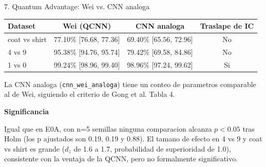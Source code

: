 \documentclass[aspectratio=169]{beamer}
\newcommand{\bmheading}[2]{\textbf{\color{#1}#2}\par\smallskip}
\newcommand{\bandedtable}{\rowcolors{2}{white}{bmRowAlt}}
\begin{document}
\begin{frame}{7. Quantum Advantage: Wei vs. CNN analoga}
  \footnotesize
  \bandedtable
  \begin{tabular}{@{}lccc@{}}
    \toprule
    \textbf{Dataset} & \textbf{Wei (QCNN)} & \textbf{CNN analoga} & \textbf{Traslape de IC} \\
    \midrule
    coat vs shirt & 77.10\% [76.68, 77.36] & 69.40\% [65.56, 72.96] & No \\
    4 vs 9        & 95.38\% [94.76, 95.74] & 79.42\% [69.58, 84.86] & No \\
    1 vs 0        & 99.24\% [98.96, 99.40] & 98.96\% [97.24, 99.62] & Si \\
    \bottomrule
  \end{tabular}

  \vspace{10pt}
  La CNN analoga (\texttt{cnn\_wei\_analoga}) tiene un conteo de parametros
  comparable al de Wei, siguiendo el criterio de Gong et al. Tabla 4.

  \vspace{6pt}
  \begin{amberbox}
    \bmheading{bmAmber}{Significancia}
    Igual que en E0A, con n=5 semillas ninguna comparacion alcanza $p<0.05$
    tras Holm (los p ajustados son 0.19, 0.19 y 0.88). El tamano de efecto en
    4 vs 9 y coat vs shirt es grande ($d_z$ de 1.6 a 1.7, probabilidad de
    superioridad de 1.0), consistente con la ventaja de la QCNN, pero no
    formalmente significativo.
  \end{amberbox}
\end{frame}
\end{document}
